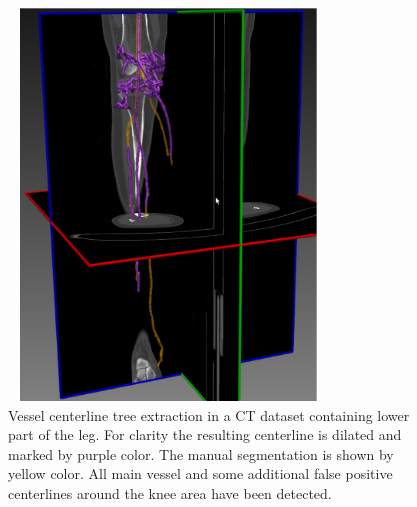 \documentclass[10pt, a4paper]{article}
\begin{document}
\begin{enumerate}
\begin{figure}[!htbp]
\centering
\includegraphics[width=85mm,height=104mm]{figures/research/kristina_fibula.png}
\caption{\label{fig:Skeleton}
Vessel centerline tree extraction in a CT dataset containing lower part of the leg. For clarity the resulting centerline is dilated and marked by purple color.  The manual segmentation is shown by yellow color. All main vessel and some additional false positive centerlines around the knee area have been detected.} 
\end{figure}



\end{enumerate}
\end{document}
